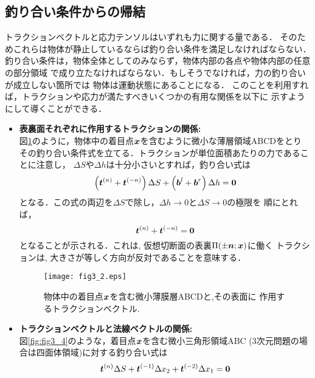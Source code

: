 \documentclass[10pt,a4j]{jbook}
\begin{document}
\subsection{釣り合い条件からの帰結}\label{equib}
トラクションベクトルと応力テンソルはいずれも力に関する量である．
そのためこれらは物体が静止しているならば釣り合い条件を満足しなければならない．
釣り合い条件は，物体全体としてのみならず，物体内部の各点や物体内部の任意の部分領域
で成り立たなければならない．もしそうでなければ，力の釣り合いが成立しない箇所では
物体は運動状態にあることになる．
このことを利用すれば，トラクションや応力が満たすべきいくつかの有用な関係を以下に
示すようにして導くことができる．
\begin{itemize}
\item
	{\bf 表裏面それぞれに作用するトラクションの関係:}\\
	図\ref{fig:fig3_2}のように，物体中の着目点$\mbox{\boldmath $x$}$を含むように微小な薄層領域ABCDをとり
	その釣り合い条件式を立てる．トラクションが単位面積あたりの力であることに注意し，
	$\Delta S$や$\Delta h$は十分小さいとすれば，釣り合い式は
	\begin{equation}
		\left(\mbox{\boldmath $t$}^{(n)}+\mbox{\boldmath $t$}^{(-n)}\right)\Delta S 
		+
		\left(\mbox{\boldmath $b$}^{l}+\mbox{\boldmath $b$}^{r}\right)\Delta h 
		=\mbox{\boldmath $0$}
	\end{equation}
	となる．この式の両辺を$\Delta S$で除し，$\Delta h \rightarrow 0$と$\Delta S\rightarrow 0$の極限を
	順にとれば，
	\begin{equation}
		\mbox{\boldmath $t$}^{(n)}+\mbox{\boldmath $t$}^{(-n)}=\mbox{\boldmath $0$}
		\label{eqn:t_pmn}
	\end{equation}
	となることが示される．これは, 仮想切断面の表裏$\Pi(\pm \mbox{\boldmath $n$};\mbox{\boldmath $x$})$に働く
	トラクションは, 大きさが等しく方向が反対であることを意味する．
	\begin{figure}[h]
	\begin{center}
	\texttt{[image: fig3\_2.eps]} 
	\end{center}
	\caption{物体中の着目点$\mbox{\boldmath $x$}$を含む微小薄膜層ABCDと,その表面に
	作用するトラクションベクトル. } 
	\label{fig:fig3_2}
	\end{figure}
\item
	{\bf トラクションベクトルと法線ベクトルの関係:}\\
	図\ref{fig:fig3_4}のような，着目点$\mbox{\boldmath $x$}$を含む微小三角形領域ABC
	(3次元問題の場合は四面体領域)に対する釣り合い式は
	\begin{equation}
		\mbox{\boldmath $t$}^{(n)}\Delta S +\mbox{\boldmath $t$}^{(-1)}\Delta x_2 + \mbox{\boldmath $t$}^{(-2)}\Delta x_1 =\mbox{\boldmath $0$}
		\label{eqn:equib_tri}
	\end{equation}

\end{itemize}
\end{document}
